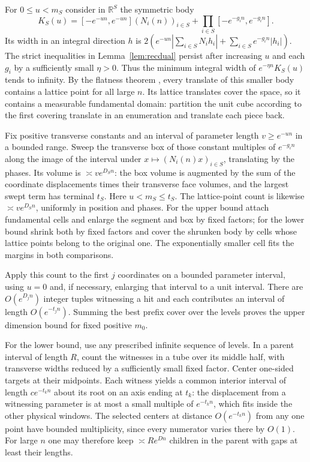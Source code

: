 \documentclass[11pt,a4paper,reqno]{amsart}
\theoremstyle{definition}
\theoremstyle{remark}
\numberwithin{equation}{section}
\begin{document}
For \(0\le u<m_S\) consider in \(\mathbb R^S\) the symmetric body
\[
 K_S(u)=[-e^{-un},e^{-un}](N_i(n))_{i\in S}
                  +\prod_{i\in S}[-e^{-g_i n},e^{-g_i n}].
\]
Its width in an integral direction \(h\) is
\(2(e^{-un}|\sum_{i\in S}N_i h_i|+\sum_{i\in S}e^{-g_i n}|h_i|)\).
The strict inequalities in Lemma~\ref{lem:recdual} persist after increasing \(u\) and each \(g_i\) by a sufficiently small \(\eta>0\). Thus the minimum integral width of \(e^{-\eta n}K_S(u)\) tends to infinity. By the flatness theorem \cite{KL}, every translate of this smaller body contains a lattice point for all large \(n\). Its lattice translates cover the space, so it contains a measurable fundamental domain: partition the unit cube according to the first covering translate in an enumeration and translate each piece back.

Fix positive transverse constants and an interval of parameter length \(v\ge e^{-un}\) in a bounded range. Sweep the transverse box of those constant multiples of \(e^{-g_i n}\) along the image of the interval under \(x\mapsto(N_i(n)x)_{i\in S}\), translating by the phases. Its volume is \(\asymp v e^{D_S n}\): the box volume is augmented by the sum of the coordinate displacements times their transverse face volumes, and the largest swept term has terminal \(t_S\). Here \(u<m_S\le t_S\). The lattice-point count is likewise \(\asymp v e^{D_S n}\), uniformly in position and phases. For the upper bound attach fundamental cells and enlarge the segment and box by fixed factors; for the lower bound shrink both by fixed factors and cover the shrunken body by cells whose lattice points belong to the original one. The exponentially smaller cell fits the margins in both comparisons.

Apply this count to the first \(j\) coordinates on a bounded parameter interval, using \(u=0\) and, if necessary, enlarging that interval to a unit interval. There are \(O(e^{D_jn})\) integer tuples witnessing a hit and each contributes an interval of length \(O(e^{-t_jn})\). Summing the best prefix cover over the levels proves the upper dimension bound for fixed positive \(m_0\).

For the lower bound, use any prescribed infinite sequence of levels. In a parent interval of length \(R\), count the witnesses in a tube over its middle half, with transverse widths reduced by a sufficiently small fixed factor. Center one-sided targets at their midpoints. Each witness yields a common interior interval of length \(c e^{-t_kn}\) about its root on an axis ending at \(t_k\): the displacement from a witnessing parameter is at most a small multiple of \(e^{-t_kn}\), which fits inside the other physical windows. The selected centers at distance \(O(e^{-t_k n})\) from any one point have bounded multiplicity, since every numerator varies there by \(O(1)\). For large \(n\) one may therefore keep \(\asymp R e^{Dn}\) children in the parent with gaps at least their lengths.
\end{document}
